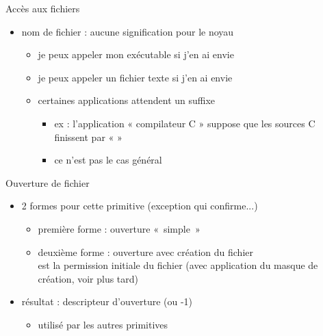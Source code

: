 \begin {frame} {Accès aux fichiers}

    \begin {itemize}
	\item nom de fichier : aucune signification pour le noyau
	    \begin {itemize}
		\item je peux appeler mon exécutable 
		    si j'en ai envie
		\item je peux appeler un fichier texte 
		    si j'en ai envie
		    \vspace* {0.6mm}
		\item certaines applications attendent un suffixe
		    \begin {itemize}
			\item ex : l'application « compilateur C »
			    suppose que les sources C finissent par «
			     »
			\item ce n'est pas le cas général
		    \end {itemize}
	    \end {itemize}
    \end {itemize}
\end {frame}

\begin {frame} {Ouverture de fichier}


    \begin {itemize}
	\item 2 formes pour cette primitive (exception qui confirme...)
	    \begin {itemize}
		\item première forme : ouverture «~simple~»
		\item deuxième forme : ouverture avec création du fichier
		    \\
		    \implique {} est la permission initiale du fichier
		    (avec application du masque de création, voir
		    plus tard)
	    \end {itemize}

	\item résultat : descripteur d'ouverture (ou -1)

	    \begin {itemize}
		\item utilisé par les autres primitives
	    \end {itemize}
    \end {itemize}
\end {frame}

